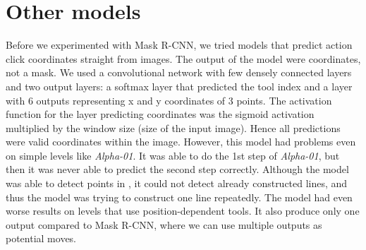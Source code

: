 \section{Other models}
Before we experimented with Mask {R-CNN}, we tried models that predict action click coordinates straight from images. The output of the model were coordinates, not a mask. We used a convolutional network with few densely connected layers and two output layers: a softmax layer that predicted the tool index and a layer with 6 outputs representing x and y coordinates of 3 points. The activation function for the layer predicting coordinates was the sigmoid activation multiplied by the window size (size of the input image). Hence all predictions were valid coordinates within the image. However, this model had problems even on simple levels like \textit{Alpha-01}. It was able to do the 1st step of \textit{Alpha-01}, but then it was never able to predict the second step correctly. Although the model was able to detect points in , it could not detect already constructed lines, and thus the model was trying to construct one line repeatedly. The model had even worse results on levels that use position-dependent tools. It also produce only one output compared to Mask {R-CNN}, where we can use multiple outputs as potential moves.


